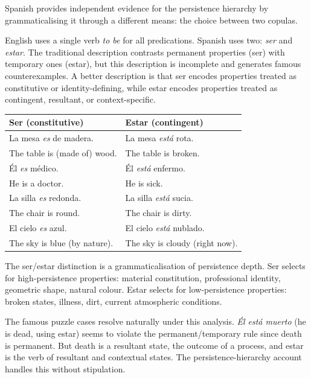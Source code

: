 \documentclass[11pt]{article}
\theoremstyle{rthm}
\theoremstyle{rdef}
\theoremstyle{remark}
\begin{document}
Spanish provides independent evidence for the persistence hierarchy by
grammaticalising it through a different means: the choice between two copulas.

English uses a single verb \emph{to be} for all predications. Spanish uses
two: \emph{ser} and \emph{estar}. The traditional description contrasts
permanent properties (ser) with temporary ones (estar), but this description
is incomplete and generates famous counterexamples. A better description is
that ser encodes properties treated as constitutive or identity-defining, while
estar encodes properties treated as contingent, resultant, or context-specific.

\medskip
\begin{center}
\renewcommand{\arraystretch}{1.3}
\begin{tabular}{p{5cm} p{5cm}}
\toprule
\textbf{Ser} (constitutive) & \textbf{Estar} (contingent) \\
\midrule
La mesa \emph{es} de madera. & La mesa \emph{est\'a} rota. \\
The table is (made of) wood. & The table is broken. \\[4pt]
\'El \emph{es} m\'edico. & \'El \emph{est\'a} enfermo. \\
He is a doctor. & He is sick. \\[4pt]
La silla \emph{es} redonda. & La silla \emph{est\'a} sucia. \\
The chair is round. & The chair is dirty. \\[4pt]
El cielo \emph{es} azul. & El cielo \emph{est\'a} nublado. \\
The sky is blue (by nature). & The sky is cloudy (right now). \\
\bottomrule
\end{tabular}
\end{center}
\medskip

The ser/estar distinction is a grammaticalisation of persistence depth. Ser
selects for high-persistence properties: material constitution, professional
identity, geometric shape, natural colour. Estar selects for low-persistence
properties: broken states, illness, dirt, current atmospheric conditions.

The famous puzzle cases resolve naturally under this analysis. \emph{\'El
est\'a muerto} (he is dead, using estar) seems to violate the
permanent/temporary rule since death is permanent. But death is a resultant
state, the outcome of a process, and estar is the verb of resultant and
contextual states. The persistence-hierarchy account handles this without
stipulation.
\end{document}
